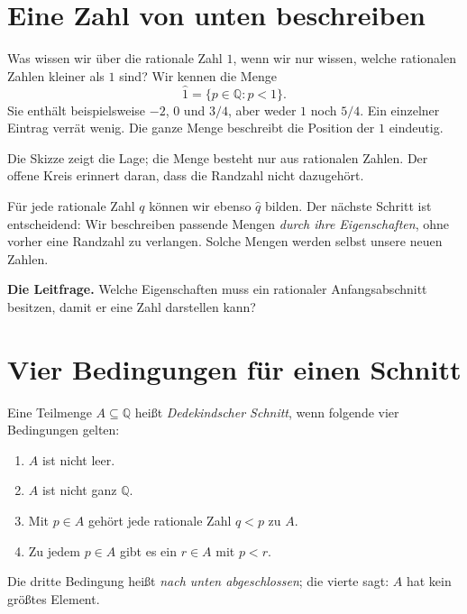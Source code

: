 \clearpage
\section{Eine Zahl von unten beschreiben}
\label{cuts:idea}

Was wissen wir über die rationale Zahl $1$, wenn wir nur wissen,
welche rationalen Zahlen kleiner als $1$ sind?
Wir kennen die Menge
\[
 \widehat 1=\{p\in\mathbb Q:p<1\}.
\]
Sie enthält beispielsweise $-2$, $0$ und $3/4$, aber weder $1$ noch $5/4$.
Ein einzelner Eintrag verrät wenig. Die ganze Menge beschreibt die
Position der $1$ eindeutig.

\begin{center}
\end{center}
Die Skizze zeigt die Lage; die Menge besteht nur aus rationalen Zahlen.
Der offene Kreis erinnert daran, dass die Randzahl nicht dazugehört.

Für jede rationale Zahl $q$ können wir ebenso $\widehat q$ bilden.
Der nächste Schritt ist entscheidend: Wir beschreiben passende Mengen
\emph{durch ihre Eigenschaften}, ohne vorher eine Randzahl zu verlangen.
Solche Mengen werden selbst unsere neuen Zahlen.

\textbf{Die Leitfrage.}
Welche Eigenschaften muss ein rationaler Anfangsabschnitt besitzen,
damit er eine Zahl darstellen kann?

\clearpage
\section{Vier Bedingungen für einen Schnitt}
\label{cuts:definition}

\begin{definition}
Eine Teilmenge $A\subseteq\mathbb Q$ heißt \emph{Dedekindscher Schnitt},
wenn folgende vier Bedingungen gelten:
\begin{enumerate}
 \item $A$ ist nicht leer.
 \item $A$ ist nicht ganz $\mathbb Q$.
 \item Mit $p\in A$ gehört jede rationale Zahl $q<p$ zu $A$.
 \item Zu jedem $p\in A$ gibt es ein $r\in A$ mit $p<r$.
\end{enumerate}
\end{definition}
Die dritte Bedingung heißt \emph{nach unten abgeschlossen};
die vierte sagt: $A$ hat kein größtes Element.

